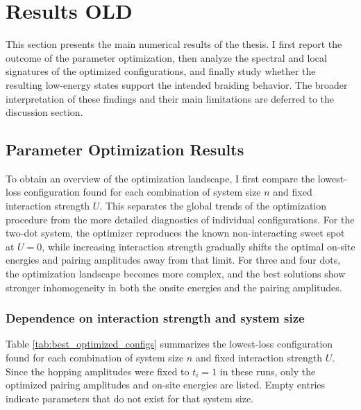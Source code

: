 \chapter{Results OLD}
This section presents the main numerical results of the thesis. I first report the outcome of the parameter optimization, then analyze the spectral and local signatures of the optimized configurations, and finally study whether the resulting low-energy states support the intended braiding behavior. The broader interpretation of these findings and their main limitations are deferred to the discussion section.

\section{Parameter Optimization Results}
To obtain an overview of the optimization landscape, I first compare the lowest-loss configuration found for each combination of system size $n$ and fixed interaction strength $U$. This separates the global trends of the optimization procedure from the more detailed diagnostics of individual configurations. For the two-dot system, the optimizer reproduces the known non-interacting sweet spot at $U=0$, while increasing interaction strength gradually shifts the optimal on-site energies and pairing amplitudes away from that limit. For three and four dots, the optimization landscape becomes more complex, and the best solutions show stronger inhomogeneity in both the onsite energies and the pairing amplitudes.


\subsection{Dependence on interaction strength and system size}
Table \ref{tab:best_optimized_configs} summarizes the lowest-loss configuration found for each combination of system size $n$ and fixed interaction strength $U$. Since the hopping amplitudes were fixed to $t_i = 1$ in these runs, only the optimized pairing amplitudes and on-site energies are listed. Empty entries indicate parameters that do not exist for that system size.

